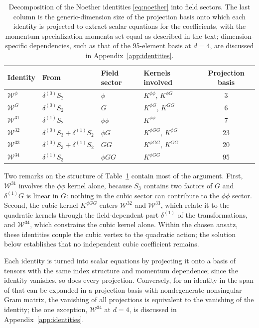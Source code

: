 \documentclass[prd,aps,preprint,superscriptaddress,nofootinbib,amsmath,amssymb,eqsecnum]{revtex4-2}
\newcommand{\W}{\mathcal{W}}
\providecommand{\DIFaddtex}[1]{{\protect\color{blue} \sf #1}} %
\providecommand{\DIFdeltex}[1]{{\protect\color{red} \scriptsize #1}} %
\providecommand{\DIFaddbegin}{} %
\providecommand{\DIFaddend}{} %
\providecommand{\DIFdelbegin}{} %
\providecommand{\DIFdelend}{} %
\providecommand{\DIFaddFL}[1]{\DIFadd{#1}} %
\providecommand{\DIFdelFL}[1]{\DIFdel{#1}} %
\providecommand{\DIFaddbeginFL}{} %
\providecommand{\DIFaddendFL}{} %
\providecommand{\DIFdelbeginFL}{} %
\providecommand{\DIFdelendFL}{} %
\providecommand{\DIFadd}[1]{\texorpdfstring{\DIFaddtex{#1}}{#1}} %
\providecommand{\DIFdel}[1]{\texorpdfstring{\DIFdeltex{#1}}{}} %
\begin{document}
\begin{table}[htb]
\centering
\setlength{\tabcolsep}{10pt}
\begin{tabular}{@{}llllc@{}}
\toprule
Identity & From & Field sector & Kernels involved & Projection basis \\
\midrule
$\W^{\phi}$  & $\delta^{(0)}S_2$ & $\phi$   & $K^{\phi\phi}$, $K^{\phi G}$ & 3 \\
$\W^{G}$     & $\delta^{(0)}S_2$ & $G$      & $K^{\phi G}$, $K^{GG}$ & 6 \\
$\W^{31}$    & $\delta^{(1)}S_2$ & $\phi\phi$ & $K^{\phi\phi}$ & 7 \\
$\W^{32}$    & $\delta^{(0)}S_3+\delta^{(1)}S_2$ & $\phi G$ & $K^{\phi GG}$, $K^{\phi G}$ & 23 \\
$\W^{33}$    & $\delta^{(0)}S_3+\delta^{(1)}S_2$ & $GG$ & $K^{\phi GG}$, $K^{GG}$ & 20 \\
$\W^{34}$    & $\delta^{(1)}S_3$ & $\phi GG$ & $K^{\phi GG}$ & 95 \\
\bottomrule
\end{tabular}
\caption{Decomposition of the Noether identities \eqref{eq:noether} into field sectors. The
last column is the generic-dimension size of the projection basis onto which each identity
is projected to extract scalar equations for the coefficients, with the \DIFdelbeginFL \DIFdelFL{momentum
specialization }\DIFdelendFL \DIFaddbeginFL \DIFaddFL{momenta
set equal as }\DIFaddendFL described in the text; dimension-specific dependencies, such as that of the
95-element basis at $d=4$, are discussed in Appendix~\ref{app:identities}.}
\label{tab:identities}
\end{table}

Two remarks on the structure of Table~\ref{tab:identities} contain most of the argument. First,
$\W^{31}$ involves the $\phi\phi$ kernel alone, because $S_3$ contains two factors of $G$ and
$\delta^{(1)}G$ is linear in $G$: nothing in the cubic sector can contribute to the $\phi\phi$ sector.
Second, the cubic kernel $K^{\phi GG}$ enters $\W^{32}$ and $\W^{33}$, which relate it to
the quadratic kernels through the field-dependent part $\delta^{(1)}$ of the
transformations, and $\W^{34}$, which constrains the cubic kernel alone. Within the chosen
ansatz, these identities couple the cubic vertex to the quadratic action; the solution
below establishes that no independent cubic coefficient remains.

Each identity is turned into scalar equations by projecting it onto a basis of tensors with
the same index structure and momentum dependence; since the identity vanishes, so does every
projection. Conversely, for an identity \DIFdelbegin \DIFdel{in the span of }\DIFdelend \DIFaddbegin \DIFadd{that can be expanded in }\DIFaddend a projection basis with \DIFdelbegin \DIFdel{nondegenerate
}\DIFdelend \DIFaddbegin \DIFadd{nonsingular
}\DIFaddend Gram matrix, the vanishing of all projections is equivalent to the vanishing of the identity;
the one exception, $\W^{34}$ at $d=4$, is discussed in Appendix~\ref{app:identities}.
\end{document}
